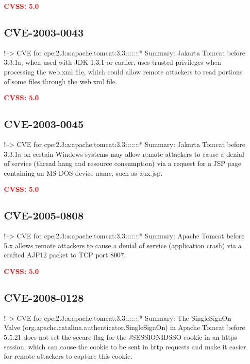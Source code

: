 \documentclass[a4paper, 12pt]{article}
\begin{document}
\textbf{\textcolor{red}{CVSS: 5.0}}

\hypertarget{cve-2003-0043}{%
\subsection{CVE-2003-0043}\label{cve-2003-0043}}

!--\textgreater{} CVE for
cpe:2.3:a:apache:tomcat:3.3:\emph{:}:\emph{:}:\emph{:}:* Summary:
Jakarta Tomcat before 3.3.1a, when used with JDK 1.3.1 or earlier, uses
trusted privileges when processing the web.xml file, which could allow
remote attackers to read portions of some files through the web.xml
file.

\textbf{\textcolor{red}{CVSS: 5.0}}

\hypertarget{cve-2003-0045}{%
\subsection{CVE-2003-0045}\label{cve-2003-0045}}

!--\textgreater{} CVE for
cpe:2.3:a:apache:tomcat:3.3:\emph{:}:\emph{:}:\emph{:}:* Summary:
Jakarta Tomcat before 3.3.1a on certain Windows systems may allow remote
attackers to cause a denial of service (thread hang and resource
consumption) via a request for a JSP page containing an MS-DOS device
name, such as aux.jsp.

\textbf{\textcolor{red}{CVSS: 5.0}}

\hypertarget{cve-2005-0808}{%
\subsection{CVE-2005-0808}\label{cve-2005-0808}}

!--\textgreater{} CVE for
cpe:2.3:a:apache:tomcat:3.3:\emph{:}:\emph{:}:\emph{:}:* Summary: Apache
Tomcat before 5.x allows remote attackers to cause a denial of service
(application crash) via a crafted AJP12 packet to TCP port 8007.

\textbf{\textcolor{red}{CVSS: 5.0}}

\hypertarget{cve-2008-0128}{%
\subsection{CVE-2008-0128}\label{cve-2008-0128}}

!--\textgreater{} CVE for
cpe:2.3:a:apache:tomcat:3.3:\emph{:}:\emph{:}:\emph{:}:* Summary: The
SingleSignOn Valve (org.apache.catalina.authenticator.SingleSignOn) in
Apache Tomcat before 5.5.21 does not set the secure flag for the
JSESSIONIDSSO cookie in an https session, which can cause the cookie to
be sent in http requests and make it easier for remote attackers to
capture this cookie.
\end{document}
